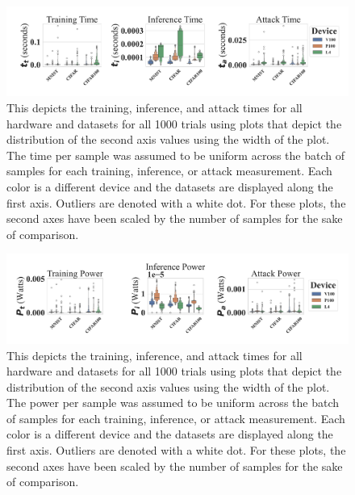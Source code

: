 \documentclass[sn-mathphys-num]{sn-jnl}%
\begin{document}
\begin{figure}[h]
    \centering
    \includegraphics[width=\textwidth]{plots/combined/time.pdf}
    \caption{This depicts the training, inference, and attack times for all hardware and datasets for all 1000 trials using plots that depict the distribution of the second axis values using the width of the plot. The time per sample was assumed to be uniform across the batch of samples for each training, inference, or attack measurement.   
    Each color is a different device and the datasets are displayed along the first axis. Outliers are denoted with a white dot. For these plots, the second axes have been scaled by the number of samples for the sake of comparison.} 
    \label{fig:time}
\end{figure}

\begin{figure}[h]
    \centering
    \includegraphics[width=\textwidth]{plots/combined/power.pdf}
    \caption{This depicts the training, inference, and attack times for all hardware and datasets for all 1000 trials using plots that depict the distribution of the second axis values using the width of the plot. The power per sample was assumed to be uniform across the batch of samples for each training, inference, or attack measurement.   
    Each color is a different device and the datasets are displayed along the first axis. Outliers are denoted with a white dot. For these plots, the second axes have been scaled by the number of samples for the sake of comparison.} 
    \label{fig:power}
\end{figure}
\end{document}
